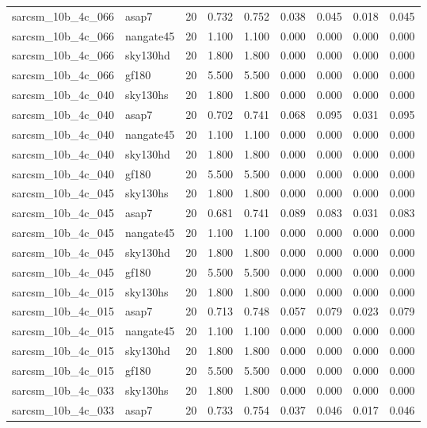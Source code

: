 \begin{tabular}{llrrrrrrr}
sarcsm\_10b\_4c\_066 & asap7 & 20 & 0.732 & 0.752 & 0.038 & 0.045 & 0.018 & 0.045 \\
sarcsm\_10b\_4c\_066 & nangate45 & 20 & 1.100 & 1.100 & 0.000 & 0.000 & 0.000 & 0.000 \\
sarcsm\_10b\_4c\_066 & sky130hd & 20 & 1.800 & 1.800 & 0.000 & 0.000 & 0.000 & 0.000 \\
sarcsm\_10b\_4c\_066 & gf180 & 20 & 5.500 & 5.500 & 0.000 & 0.000 & 0.000 & 0.000 \\
sarcsm\_10b\_4c\_040 & sky130hs & 20 & 1.800 & 1.800 & 0.000 & 0.000 & 0.000 & 0.000 \\
sarcsm\_10b\_4c\_040 & asap7 & 20 & 0.702 & 0.741 & 0.068 & 0.095 & 0.031 & 0.095 \\
sarcsm\_10b\_4c\_040 & nangate45 & 20 & 1.100 & 1.100 & 0.000 & 0.000 & 0.000 & 0.000 \\
sarcsm\_10b\_4c\_040 & sky130hd & 20 & 1.800 & 1.800 & 0.000 & 0.000 & 0.000 & 0.000 \\
sarcsm\_10b\_4c\_040 & gf180 & 20 & 5.500 & 5.500 & 0.000 & 0.000 & 0.000 & 0.000 \\
sarcsm\_10b\_4c\_045 & sky130hs & 20 & 1.800 & 1.800 & 0.000 & 0.000 & 0.000 & 0.000 \\
sarcsm\_10b\_4c\_045 & asap7 & 20 & 0.681 & 0.741 & 0.089 & 0.083 & 0.031 & 0.083 \\
sarcsm\_10b\_4c\_045 & nangate45 & 20 & 1.100 & 1.100 & 0.000 & 0.000 & 0.000 & 0.000 \\
sarcsm\_10b\_4c\_045 & sky130hd & 20 & 1.800 & 1.800 & 0.000 & 0.000 & 0.000 & 0.000 \\
sarcsm\_10b\_4c\_045 & gf180 & 20 & 5.500 & 5.500 & 0.000 & 0.000 & 0.000 & 0.000 \\
sarcsm\_10b\_4c\_015 & sky130hs & 20 & 1.800 & 1.800 & 0.000 & 0.000 & 0.000 & 0.000 \\
sarcsm\_10b\_4c\_015 & asap7 & 20 & 0.713 & 0.748 & 0.057 & 0.079 & 0.023 & 0.079 \\
sarcsm\_10b\_4c\_015 & nangate45 & 20 & 1.100 & 1.100 & 0.000 & 0.000 & 0.000 & 0.000 \\
sarcsm\_10b\_4c\_015 & sky130hd & 20 & 1.800 & 1.800 & 0.000 & 0.000 & 0.000 & 0.000 \\
sarcsm\_10b\_4c\_015 & gf180 & 20 & 5.500 & 5.500 & 0.000 & 0.000 & 0.000 & 0.000 \\
sarcsm\_10b\_4c\_033 & sky130hs & 20 & 1.800 & 1.800 & 0.000 & 0.000 & 0.000 & 0.000 \\
sarcsm\_10b\_4c\_033 & asap7 & 20 & 0.733 & 0.754 & 0.037 & 0.046 & 0.017 & 0.046 \\

\end{tabular}

